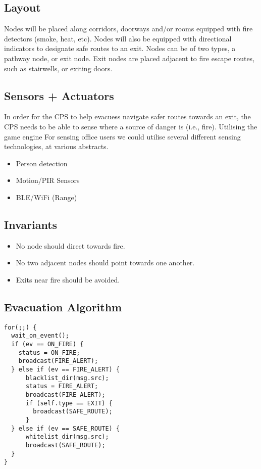 \subsection{Layout}
Nodes will be placed along corridors, doorways and/or rooms equipped with fire detectors (smoke, heat, etc). Nodes will also be equipped with directional indicators to designate safe routes to an exit. Nodes can be of two types, a pathway node, or exit node. Exit nodes are placed adjacent to fire escape routes, such as stairwells, or exiting doors.
\subsection{Sensors + Actuators}
\label{subsec:Sensors + Actuators}
In order for the CPS to help evacuess navigate safer routes towards an exit, the CPS needs to be able to sense where a source of danger is (i.e., fire). Utilising the game engine
For sensing office users we could utilise several different sensing technologies, at various abstracts.
\begin{itemize}
  \item Person detection
  \item Motion/PIR Sensors
  \item BLE/WiFi (Range)
\end{itemize}
\subsection{Invariants}
\begin{itemize}
  \item No node should direct towards fire.
  \item No two adjacent nodes should point towards one another.
  \item Exits near fire should be avoided.
\end{itemize}

\subsection{Evacuation Algorithm}
\begin{verbatim}
for(;;) {
  wait_on_event();
  if (ev == ON_FIRE) {
    status = ON_FIRE;
    broadcast(FIRE_ALERT);
  } else if (ev == FIRE_ALERT) {
      blacklist_dir(msg.src);
      status = FIRE_ALERT;
      broadcast(FIRE_ALERT);
      if (self.type == EXIT) {
        broadcast(SAFE_ROUTE);
      }
  } else if (ev == SAFE_ROUTE) {
      whitelist_dir(msg.src);
      broadcast(SAFE_ROUTE);
  }
}
\end{verbatim}
